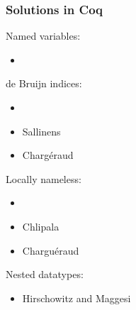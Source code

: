 \documentclass[notheorems]{beamer}
\begin{document}
\begin{frame}

  \frametitle{Solutions in Coq}

  Named variables:
  \begin{itemize}
    \item {} 
  \end{itemize}

  de Bruijn indices:
  \begin{itemize}
    \item {} 
    \item Sallinens 
    \item Charg\'eraud 
  \end{itemize}

  Locally nameless:
  \begin{itemize}
    \item {} 
    \item Chlipala 
    \item Chargu\'eraud 
  \end{itemize}

  Nested datatypes:
  \begin{itemize}
    \item Hirschowitz and Maggesi 
  \end{itemize}

\end{frame}
\end{document}
